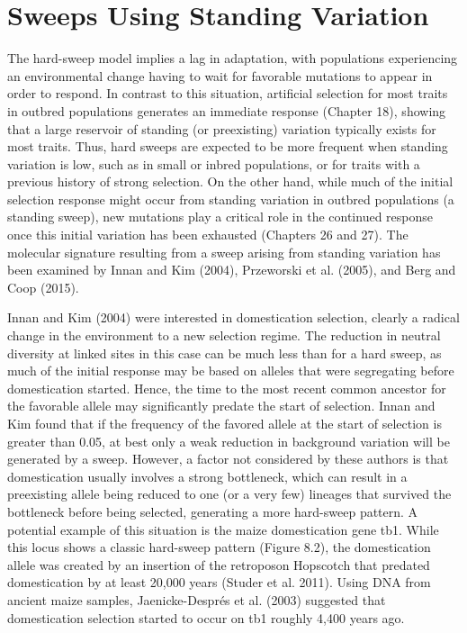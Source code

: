 \documentclass{article}
\begin{document}
\section{Sweeps Using Standing Variation}
The hard-sweep model implies a lag in adaptation, with populations experiencing an environmental change having to wait for favorable mutations to appear in order to respond. In contrast to this situation, artificial selection for most traits in outbred populations generates an immediate response (Chapter 18), showing that a large reservoir of standing (or preexisting) variation typically exists for most traits. Thus, hard sweeps are expected to be more frequent when standing variation is low, such as in small or inbred populations, or for traits with a previous history of strong selection. On the other hand, while much of the initial selection response might occur from standing variation in outbred populations (a standing sweep), new mutations play a critical role in the continued response once this initial variation has been exhausted (Chapters 26 and 27). The molecular signature resulting from a sweep arising from standing variation has been examined by Innan and Kim (2004), Przeworski et al. (2005), and Berg and Coop (2015).

Innan and Kim (2004) were interested in domestication selection, clearly a radical change in the environment to a new selection regime. The reduction in neutral diversity at linked sites in this case can be much less than for a hard sweep, as much of the initial response may be based on alleles that were segregating before domestication started. Hence, the time to the most recent common ancestor for the favorable allele may significantly predate the start of selection. Innan and Kim found that if the frequency of the favored allele at the start of selection is greater than 0.05, at best only a weak reduction in background variation will be generated by a sweep. However, a factor not considered by these authors is that domestication usually involves a strong bottleneck, which can result in a preexisting allele being reduced to one (or a very few) lineages that survived the bottleneck before being selected, generating a more hard-sweep pattern. A potential example of this situation is the maize domestication gene tb1. While this locus shows a classic hard-sweep pattern (Figure 8.2), the domestication allele was created by an insertion of the retroposon Hopscotch that predated domestication by at least 20,000 years (Studer et al. 2011). Using DNA from ancient maize samples, Jaenicke-Després et al. (2003) suggested that domestication selection started to occur on tb1 roughly 4,400 years ago.
\end{document}
